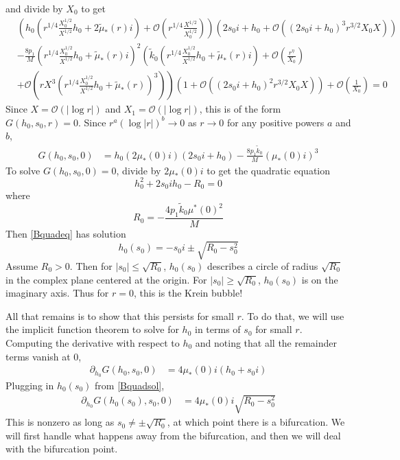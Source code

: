 \documentclass[thesis.tex]{subfiles}
\begin{document}
and divide by $X_0$ to get
\begin{equation*}
\begin{aligned}
&\left( h_0 \left( r^{1/4}\frac{X_0^{1/2}}{X^{1/2}} h_0 + 2 \tilde{\mu}_*(r) i\right) + \mathcal{O}\left( r^{1/4} \frac{X^{1/2}}{X_0^{1/2}} \right) \right) 
\left( 2 s_0 i + h_0 + \mathcal{O}\left( \left( 2 s_0 i + h_0 \right)^3 r^{3/2} X_0 X \right) \right) \\
&-\frac{8 p_1}{M} \left( r^{1/4}\frac{X_0^{1/2}}{X^{1/2}} h_0 + \tilde{\mu}_*(r) i\right)^2 \left( \tilde{k}_0 \left(r^{1/4}\frac{X_0^{1/2}}{X^{1/2}} h_0 + \tilde{\mu}_*(r)i \right) + \mathcal{O}\left(\frac{r^{\eta}}{X_0} \right) \right.\\
&+ \left. \mathcal{O} \left (r X^3 \left(r^{1/4} \frac{X_0^{1/2}}{X^{1/2}} h_0 + \tilde{\mu}_*(r)\right)^3 \right) \right) \left( 1 + \mathcal{O}\left( \left(2 s_0 i + h_0\right)^2 r^{3/2} X_0 X \right) \right) + \mathcal{O}\left(\frac{1}{X_0}\right) = 0
\end{aligned}
\end{equation*}
Since $X = \mathcal{O}(|\log r|)$ and $X_1 = \mathcal{O}(|\log r|)$, this is of the form $G(h_0, s_0, r) = 0$. Since $r^{a}(\log|r|)^b \rightarrow 0$ as $r \rightarrow 0$ for any positive powers $a$ and $b$, 
\begin{equation}\label{BsimpleG0}
\begin{aligned}
G(h_0, s_0, 0) &= h_0 (2 \mu_*(0) i)(2 s_0 i + h_0) - \frac{8 p_1 \tilde{k}_0}{M}(\mu_*(0) i)^3 
\end{aligned}
\end{equation}
To solve $G(h_0, s_0, 0) = 0$, divide by $2 \mu_*(0) i$ to get the quadratic equation
\begin{equation}\label{Bquadeq1}
h_0^2 + 2 s_0 i h_0 - R_0 = 0
\end{equation}
where 
\[
R_0 = -\frac{4 p_1 \tilde{k}_0 \mu^*(0)^2}{M}
\]
Then \cref{Bquadeq} has solution
\begin{equation}\label{Bquadsol}
h_0(s_0) = -s_0 i \pm \sqrt{ R_0 - s_0^2 }
\end{equation}
Assume $R_0 > 0$. Then for $|s_0| \leq \sqrt{R_0}$, $h_0(s_0)$ describes a circle of radius $\sqrt{R_0}$ in the complex plane centered at the origin. For $|s_0| \geq \sqrt{R_0}$, $h_0(s_0)$ is on the imaginary axis. Thus for $r = 0$, this is the Krein bubble!

All that remains is to show that this persists for small $r$. To do that, we will use the implicit function theorem to solve for $h_0$ in terms of $s_0$ for small $r$. Computing the derivative with respect to $h_0$ and noting that all the remainder terms vanish at 0,
\begin{align*}
\partial_{h_0} G(h_0, s_0, 0) 
&= 4\mu_*(0) i ( h_0 + s_0 i )
\end{align*}
Plugging in $h_0(s_0)$ from \cref{Bquadsol},
\begin{align*}
\partial_{h_0} G(h_0(s_0), s_0, 0) 
&= 4\mu_*(0) i \sqrt{ R_0 - s_0^2 }
\end{align*}
This is nonzero as long as $s_0 \neq \pm \sqrt{R_0}$, at which point there is a bifurcation. We will first handle what happens away from the bifurcation, and then we will deal with the bifurcation point.
\end{document}
